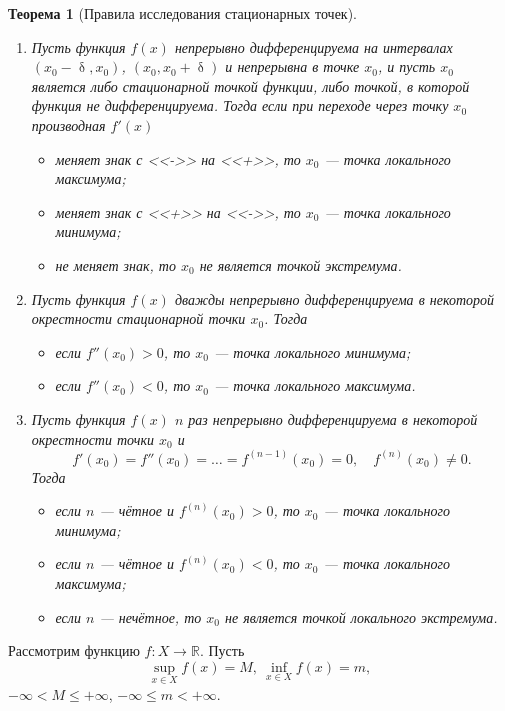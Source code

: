 \documentclass[a4paper, 12pt]{report}
\numberwithin{equation}{section}
\renewcommand{\leq}{\leqslant}
\renewcommand{\delta}{\updelta}
\newtheorem*{theorem}{Теорема}
\begin{document}
	\begin{theorem}
		[Правила исследования стационарных точек]
		\begin{enumerate}
			\item Пусть функция $f(x)$ непрерывно дифференцируема на интервалах $(x_0 - \delta, x_0)$, $(x_0, x_0 + \delta)$ и непрерывна в точке $x_0$, и пусть $x_0$ является либо стационарной точкой функции, либо точкой, в которой функция не дифференцируема. Тогда если при переходе через точку $x_0$ производная $f'(x)$
			\begin{itemize}
				\item меняет знак с <<->> на <<+>>, то $x_0$ — точка локального максимума;
				\item меняет знак с <<+>> на <<->>, то $x_0$ — точка локального минимума;
				\item не меняет знак, то $x_0$ не является точкой экстремума.
			\end{itemize}
			\item Пусть функция $f(x)$ дважды непрерывно дифференцируема в некоторой окрестности стационарной точки $x_0$. Тогда
			\begin{itemize}
				\item если $f''(x_0) > 0$, то $x_0$ — точка локального минимума;
				\item если $f''(x_0) < 0$, то $x_0$ — точка локального максимума.
			\end{itemize} 
			\item Пусть функция $f(x)$ $n$ раз непрерывно дифференцируема в некоторой окрестности точки $x_0$ и 
			\[
			f'(x_0) = f''(x_0) = \dots = f^{(n-1)}(x_0) = 0, \quad f^{(n)}(x_0) \neq 0.
			\]
			Тогда
			\begin{itemize}
				\item если $n$ — чётное и $f^{(n)}(x_0) > 0$, то $x_0$ — точка локального минимума;
				\item если $n$ — чётное и $f^{(n)}(x_0) < 0$, то $x_0$ — точка локального максимума;
				\item если $n$ — нечётное, то $x_0$ не является точкой локального экстремума.
			\end{itemize}  
		\end{enumerate}
	\end{theorem}
	\noindent
	Рассмотрим функцию $f:X\to \mathbb R$. Пусть \begin{equation*}
		\underset{x \in X}{\sup} f(x) = M,\ \underset{x \in X}{\inf} f(x) = m,
	\end{equation*}
	$-\infty < M \leq +\infty$, $-\infty \leq m < +\infty$.
\end{document}
